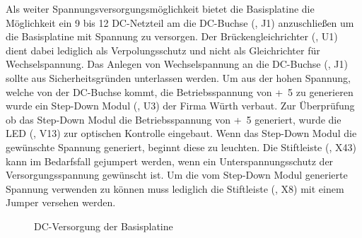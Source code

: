 Als weiter Spannungsversorgungsmöglichkeit bietet die \gls{Basisplatine} die Möglichkeit ein \unit{9}{\volt} bis \unit{12}{\volt} DC-Netzteil am die DC-Buchse (, J1) anzuschließen um die Basisplatine mit Spannung zu versorgen. Der Brückengleichrichter (, U1) dient dabei lediglich als Verpolungsschutz und nicht als Gleichrichter für Wechselspannung. Das Anlegen von Wechselspannung an die DC-Buchse (, J1) sollte aus Sicherheitsgründen unterlassen werden. Um aus der hohen Spannung, welche von der DC-Buchse kommt, die Betriebsspannung von \unit{+5}{\volt} zu generieren wurde ein Step-Down Modul (, U3) der Firma Würth verbaut. Zur Überprüfung ob das Step-Down Modul die Betriebsspannung von \unit{+5}{\volt} generiert, wurde die LED (, V13) zur optischen Kontrolle eingebaut. Wenn das Step-Down Modul die gewünschte Spannung generiert, beginnt diese zu leuchten. Die Stiftleiste (, X43) kann im Bedarfsfall gejumpert werden, wenn ein Unterspannungsschutz der Versorgungsspannung gewünscht ist. Um die vom Step-Down Modul generierte Spannung verwenden zu können muss lediglich die Stiftleiste (, X8) mit einem Jumper versehen werden.

\begin{figure}[htb]
    \centering
    \qquad
    \qquad
    \caption[DC-Versorgung der Basisplatine]{DC-Versorgung der \gls{Basisplatine}}
    \label{fig:basisplatine-dc}
\end{figure}

